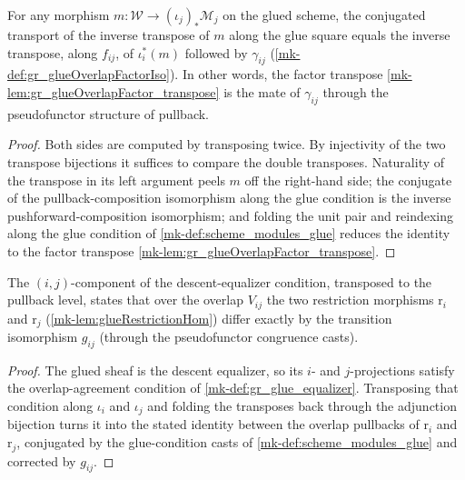 \begin{lemma}\label{mk-lem:gr_glueOverlapFactor_mate}
  \leanok

  For any morphism \(m : \mathcal{W} \to (\iota_j)_{*}\mathcal{M}_j\) on the glued
  scheme, the conjugated transport of the inverse transpose of \(m\) along the glue
  square equals the inverse transpose, along \(f_{ij}\), of \(\iota_i^{*}(m)\) followed
  by \(\gamma_{ij}\) (\ref{mk-def:gr_glueOverlapFactorIso}). In other words, the factor
  transpose \ref{mk-lem:gr_glueOverlapFactor_transpose} is the mate of \(\gamma_{ij}\)
  through the pseudofunctor structure of pullback.
\end{lemma}
\begin{proof}
  \leanok
    Both sides are computed by transposing twice. By injectivity of the two transpose
  bijections it suffices to compare the double transposes. Naturality of the transpose
  in its left argument peels \(m\) off the right-hand side; the conjugate of the
  pullback-composition isomorphism along the glue condition is the inverse
  pushforward-composition isomorphism; and folding the unit pair and reindexing along
  the glue condition of \ref{mk-def:scheme_modules_glue} reduces the identity to the
  factor transpose \ref{mk-lem:gr_glueOverlapFactor_transpose}.
\end{proof}

\begin{lemma}\label{mk-lem:gr_glueRestriction_overlap_compat}
  \leanok

  The \((i,j)\)-component of the descent-equalizer condition, transposed to the
  pullback level, states that over the overlap \(V_{ij}\) the two restriction
  morphisms \(\mathrm{r}_i\) and \(\mathrm{r}_j\) (\ref{mk-lem:glueRestrictionHom}) differ
  exactly by the transition isomorphism \(g_{ij}\) (through the pseudofunctor
  congruence casts).
\end{lemma}
\begin{proof}
  \leanok
  The glued sheaf is the descent equalizer, so its \(i\)- and \(j\)-projections satisfy
  the overlap-agreement condition of \ref{mk-def:gr_glue_equalizer}. Transposing that
  condition along \(\iota_i\) and \(\iota_j\) and folding the transposes back through
  the adjunction bijection turns it into the stated identity between the overlap
  pullbacks of \(\mathrm{r}_i\) and \(\mathrm{r}_j\), conjugated by the glue-condition
  casts of \ref{mk-def:scheme_modules_glue} and corrected by \(g_{ij}\).
\end{proof}

